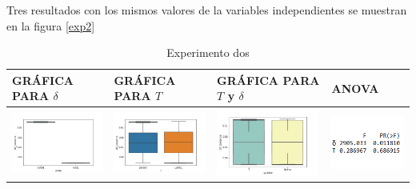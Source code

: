 Tres resultados con los mismos valores de la variables independientes se muestran en la figura \ref{exp2}

\begin{table}[H]
\caption{Experimento dos}
\centering
\begin{tabular}[c]{llll}
\multicolumn{1}{p{2.9cm}}{\textbf{GRÁFICA PARA $\delta$}} & \multicolumn{1}{p{2.9cm}}{\textbf{GRÁFICA PARA $T$}} & \multicolumn{1}{p{2.9cm}}{\textbf{GRÁFICA PARA $T$ y $\delta$}} & \multicolumn{1}{p{2.9cm}}{\textbf{ANOVA}}  \\ \hline
\multicolumn{1}{|l|}{\includegraphics[align=t, width=33mm]{cajasDeltha_exp21.jpg}}    & \multicolumn{1}{l|}{\includegraphics[align=t, width=33mm]{cajasT1_exp21.jpg} } & \multicolumn{1}{l|}{\includegraphics[align=t, width=33mm]{cajasT_Deltha_exp21.jpg} } &
\multicolumn{1}{p{3cm}|}{\includegraphics[align=t, width=30mm]{Anova21.png}}     \\ \hline

\end{tabular}
\end{table}
